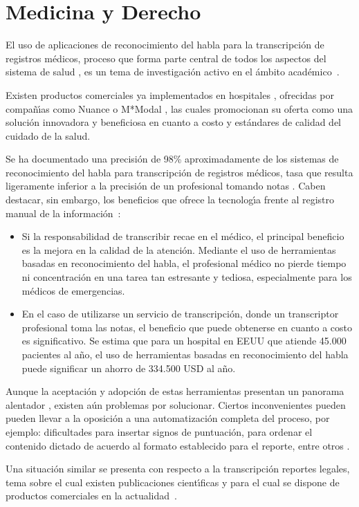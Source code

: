 \section{Medicina y Derecho}
\label{sec:medicina}

El uso de aplicaciones de reconocimiento del habla para la transcripci\'on de registros m\'edicos, proceso 
que forma parte central de todos los aspectos del sistema de salud \cite{DavidListening2009}, 
es un tema de investigaci\'on activo en el \'ambito \mbox{acad\'emico \cite{LaiMedSpeak1997, HappeCombining2002}}.

Existen productos comerciales ya implementados en hospitales \cite{USATodayHospitals}, ofrecidas por compa\~n{\'\i}as 
como Nuance \cite{NuanceOptimizing, NuanceSpeech} o M*Modal \cite{MmodalSpeech}, las cuales promocionan su oferta 
como una soluci\'on innovadora y beneficiosa en cuanto a costo y est\'andares de calidad del cuidado de la salud.

Se ha documentado una precisi\'on de 98\% aproximadamente de los sistemas de reconocimiento del habla para 
transcripci\'on de registros m\'edicos, tasa que resulta ligeramente inferior a la precisi\'on de un 
profesional tomando notas \cite{ZickVoice2001}. Caben destacar, sin embargo, los beneficios que ofrece 
la tecnolog{\'\i}a frente al registro manual de la \mbox{informaci\'on \cite{ZickVoice2001}}:

\begin{itemize}
	\item Si la responsabilidad de transcribir recae en el m\'edico, el principal beneficio es la mejora en 
	la calidad de la atenci\'on.
	Mediante el uso de herramientas basadas en reconocimiento del habla, el profesional m\'edico no pierde 
	tiempo ni concentraci\'on en una tarea tan estresante y tediosa, especialmente para los m\'edicos de emergencias.
	\item En el caso de utilizarse un servicio de transcripci\'on, donde un transcriptor profesional toma las notas,
	el beneficio que puede obtenerse en cuanto a costo es significativo. Se estima que para un 
	hospital en EEUU que atiende 45.000 pacientes al a\~no, el uso de herramientas basadas en reconocimiento 
	del habla puede significar un ahorro de 334.500 USD al a\~no.
\end{itemize}

Aunque la aceptaci\'on y adopci\'on de estas herramientas presentan un panorama alentador \cite{GrassoLong2003}, 
existen a\'un problemas por solucionar. Ciertos inconvenientes pueden pueden llevar a 
la oposici\'on a una automatizaci\'on completa del proceso, por ejemplo: dificultades para insertar 
signos de puntuaci\'on, para ordenar el contenido dictado de acuerdo al formato establecido para el reporte,
entre otros \cite{DavidListening2009}.

Una situaci\'on similar se presenta con respecto a la transcripci\'on reportes legales, 
tema sobre el cual existen publicaciones cient{\'\i}ficas \cite{van-leeuwen2008improving, FalavignaAutomatic2009} 
y para el cual se dispone de productos comerciales en la \mbox{actualidad \cite{NuanceLegal}}.
